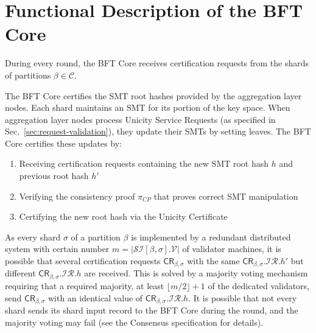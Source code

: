 \section{Functional Description of the BFT Core}

During every round, the BFT Core receives certification requests from the shards of partitions
$\beta \in \mathcal{C}$.

The BFT Core certifies the SMT root hashes provided by the aggregation layer nodes. Each shard maintains an SMT for its portion of the key space. When aggregation layer nodes process Unicity Service Requests (as specified in Sec.~\ref{sec:request-validation}), they update their SMTs by setting leaves. The BFT Core certifies these updates by:
\begin{enumerate}
	\item Receiving certification requests containing the new SMT root hash $h$ and previous root hash $h'$
	\item Verifying the consistency proof $\pi_{CP}$ that proves correct SMT manipulation
	\item Certifying the new root hash via the Unicity Certificate
\end{enumerate}

As every shard $\sigma$ of a partition $\beta$ is implemented by a redundant distributed system with certain number $m=|\mathcal{SI}[\beta,\sigma].\mathcal{V}|$ of validator machines, it is possible that several certification requests $\mathsf{CR}_{\beta,\sigma}$ with the same $\mathsf{CR}_{\beta,\sigma}.\mathcal{IR}.h'$ but different $\mathsf{CR}_{\beta,\sigma}.\mathcal{IR}.h$ are received. This is solved by a majority voting mechanism requiring that
	a required majority, at least $\lfloor m/2\rfloor + 1$ of the dedicated validators, send $\mathsf{CR}_{\beta,\sigma}$ with an identical value of $\mathsf{CR}_{\beta,\sigma}.\mathcal{IR}.h$.
It is possible that not every shard sends its shard input record to the BFT Core during the round, and the majority voting may fail (see the Consensus specification for details).


